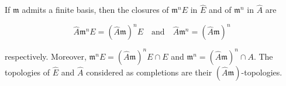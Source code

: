 If $\mathfrak{m}$ admits a finite basis, then the closures of $\mathfrak{m}^n E$ in $\hat{E}$ and of $\mathfrak{m}^n$ in $\hat{A}$ are

$$\hat{A} \mathfrak{m}^n E = (\hat{A} \mathfrak{m})^n E \quad \text{and} \quad \hat{A} \mathfrak{m}^n = (\hat{A} \mathfrak{m})^n$$

respectively. Moreover, $\mathfrak{m}^n E = (\hat{A} \mathfrak{m})^n E \cap E$ and $\mathfrak{m}^n = (\hat{A} \mathfrak{m})^n \cap A$. The topologies of $\hat{E}$ and $\hat{A}$ considered as completions are their $(\hat{A} \mathfrak{m})$-topologies.
